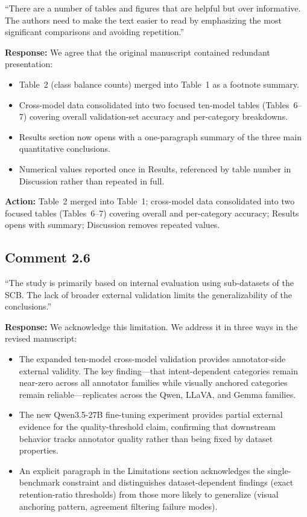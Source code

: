 \documentclass[11pt]{article}
\begin{document}
``There are a number of tables and figures that are helpful but over informative. The authors need to make the text easier to read by emphasizing the most significant comparisons and avoiding repetition.''

\textbf{Response:} We agree that the original manuscript contained redundant presentation:
\begin{itemize}[nosep]
  \item[(a)] Table~2 (class balance counts) merged into Table~1 as a footnote summary.
  \item[(b)] Cross-model data consolidated into two focused ten-model tables (Tables~6--7) covering overall validation-set accuracy and per-category breakdowns.
  \item[(c)] Results section now opens with a one-paragraph summary of the three main quantitative conclusions.
  \item[(d)] Numerical values reported once in Results, referenced by table number in Discussion rather than repeated in full.
\end{itemize}

\textbf{Action:} Table~2 merged into Table~1; cross-model data consolidated into two focused tables (Tables~6--7) covering overall and per-category accuracy; Results opens with summary; Discussion removes repeated values.

\subsection*{Comment 2.6}

``The study is primarily based on internal evaluation using sub-datasets of the SCB. The lack of broader external validation limits the generalizability of the conclusions.''

\textbf{Response:} We acknowledge this limitation. We address it in three ways in the revised manuscript:
\begin{itemize}[nosep]
  \item[(a)] The expanded ten-model cross-model validation provides annotator-side external validity. The key finding---that intent-dependent categories remain near-zero across all annotator families while visually anchored categories remain reliable---replicates across the Qwen, LLaVA, and Gemma families.
  \item[(b)] The new Qwen3.5-27B fine-tuning experiment provides partial external evidence for the quality-threshold claim, confirming that downstream behavior tracks annotator quality rather than being fixed by dataset properties.
  \item[(c)] An explicit paragraph in the Limitations section acknowledges the single-benchmark constraint and distinguishes dataset-dependent findings (exact retention-ratio thresholds) from those more likely to generalize (visual anchoring pattern, agreement filtering failure modes).
\end{itemize}
\end{document}
